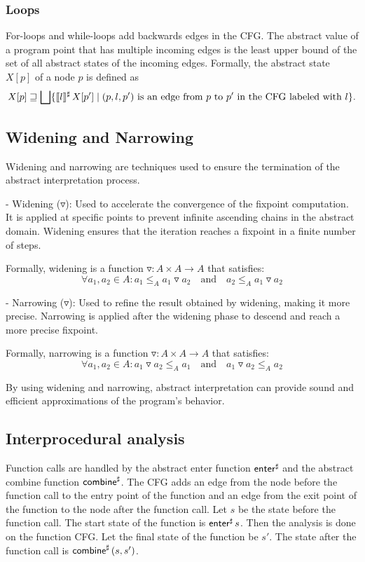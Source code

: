 \subsubsection{Loops}
For-loops and while-loops add backwards edges in the CFG.
The abstract value of a program point that has multiple incoming edges is
the least upper bound of the set of all abstract states of the incoming edges.
Formally, the abstract state $X[p]$ of a node $p$ is defined as
\[
X[p] \sqsupseteq \bigsqcup \{\llbracket l\rrbracket^\sharp\,X[p'] \mid (p,l,p') \text{ is an edge from $p$ to $p'$ in the CFG labeled with $l$}\}.
\]


\subsection{Widening and Narrowing}

Widening and narrowing are techniques used to ensure the termination of the abstract interpretation process.

- Widening (\(\triangledown\)): Used to accelerate the convergence of the fixpoint computation. It is applied at specific points to prevent infinite ascending chains in the abstract domain. Widening ensures that the iteration reaches a fixpoint in a finite number of steps.

  Formally, widening is a function \(\triangledown: A \times A \to A\) that satisfies:
  \[ \forall a_1, a_2 \in A: a_1 \leq_A a_1 \triangledown a_2 \quad \text{and} \quad a_2 \leq_A a_1 \triangledown a_2 \]

- Narrowing (\(\triangledown\)): Used to refine the result obtained by widening, making it more precise. Narrowing is applied after the widening phase to descend and reach a more precise fixpoint.

  Formally, narrowing is a function \(\triangledown: A \times A \to A\) that satisfies:
  \[ \forall a_1, a_2 \in A: a_1 \triangledown a_2 \leq_A a_1 \quad \text{and} \quad a_1 \triangledown a_2 \leq_A a_2 \]

By using widening and narrowing, abstract interpretation can provide sound and efficient approximations of the program's behavior.

\subsection{Interprocedural analysis}


Function calls are handled by the abstract enter function $\textsf{enter}^\sharp$ and the abstract combine function $\textsf{combine}^\sharp$.
The CFG adds an edge from the node before the function call to the entry point of the function and an edge from the exit point of the function to the node after the function call.
Let $s$ be the state before the function call.
The start state of the function is $\textsf{enter}^\sharp\,s$.
Then the analysis is done on the function CFG.
Let the final state of the function be $s'$.
The state after the function call is $\textsf{combine}^\sharp\,(s,s')$.




